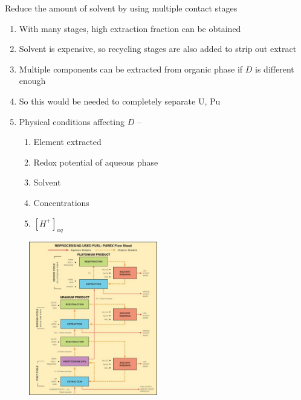 \documentclass[aspectratio=1610,pdftex,dvipsnames,compress,xcolor={dvipsnames}]{beamer}
\begin{document}
\begin{frame}{Reduce the amount of solvent by using multiple contact stages}
    \begin{enumerate}[topsep=0pt,itemsep=21pt,leftmargin=*,label=(\arabic*)]
        \item[]With many stages, high extraction fraction can be obtained
        \item[]Solvent is expensive, so recycling stages are also added to strip out extract
        \item[]Multiple components can be extracted from organic phase if $D$ is different enough
        \item[]So this would be needed to completely separate U, Pu
        \item[]Physical conditions affecting $D$ --
            \begin{enumerate}[topsep=0pt,itemsep=3pt,leftmargin=*,label=(\arabic*)]
                \item[]Element extracted
                \item[]Redox potential of aqueous phase
                \item[]Solvent
                \item[]Concentrations
                \item[]$[H^+]_{aq}$
            \end{enumerate}
    \end{enumerate}
\end{frame}


\begin{frame}{}
    \begin{figure}
        \centering
        \includegraphics[width=0.50\textwidth]{purex.jpg}
    \end{figure}
\end{frame}
\end{document}
